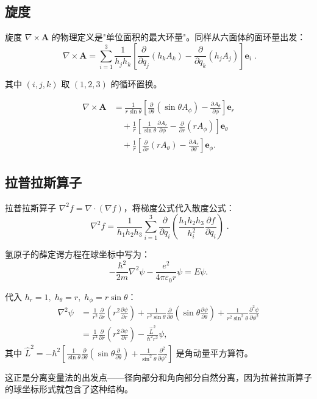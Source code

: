 \subsection{旋度}

旋度 $\nabla\times\mathbf{A}$ 的物理定义是"单位面积的最大环量"。同样从六面体的面环量出发：
\[
\boxed{\;
\nabla\times\mathbf{A}
= \sum_{i=1}^3\frac{1}{h_jh_k}
\left[\frac{\partial}{\partial q_j}(h_kA_k)-\frac{\partial}{\partial q_k}(h_jA_j)\right]\mathbf{e}_i
\;}.
\label{eq:curl_curvilinear}
\]

其中 $(i,j,k)$ 取 $(1,2,3)$ 的循环置换。

\begin{example}[球坐标中的旋度]
\begin{align*}
\nabla\times\mathbf{A}
&= \frac{1}{r\sin\theta}\left[
\frac{\partial}{\partial\theta}(\sin\theta A_\phi)
- \frac{\partial A_\theta}{\partial\phi}
\right]\mathbf{e}_r \\
&\quad + \frac{1}{r}\left[
\frac{1}{\sin\theta}\frac{\partial A_r}{\partial\phi}
- \frac{\partial}{\partial r}(r A_\phi)
\right]\mathbf{e}_\theta \\
&\quad + \frac{1}{r}\left[
\frac{\partial}{\partial r}(r A_\theta)
- \frac{\partial A_r}{\partial\theta}
\right]\mathbf{e}_\phi .
\end{align*}
\end{example}

\subsection{拉普拉斯算子}

拉普拉斯算子 $\nabla^2 f = \nabla\cdot(\nabla f)$，将梯度公式代入散度公式：
\[
\boxed{\;
\nabla^2 f = \frac{1}{h_1h_2h_3}\sum_{i=1}^3
\frac{\partial}{\partial q_i}\left(\frac{h_1h_2h_3}{h_i^2}
\frac{\partial f}{\partial q_i}\right)
\;}.
\label{eq:laplacian_curvilinear}
\]

\begin{example}
氢原子的薛定谔方程在球坐标中写为：
\[
-\frac{\hbar^2}{2m}\nabla^2\psi - \frac{e^2}{4\pi\varepsilon_0 r}\psi = E\psi.
\]

代入 $h_r=1,\;h_\theta=r,\;h_\phi=r\sin\theta$：
\begin{align*}
\nabla^2\psi &= \frac{1}{r^2}\frac{\partial}{\partial r}\left(r^2\frac{\partial\psi}{\partial r}\right)
+ \frac{1}{r^2\sin\theta}\frac{\partial}{\partial\theta}\left(\sin\theta\frac{\partial\psi}{\partial\theta}\right)
+ \frac{1}{r^2\sin^2\theta}\frac{\partial^2\psi}{\partial\phi^2} \\
&= \frac{1}{r^2}\frac{\partial}{\partial r}\left(r^2\frac{\partial\psi}{\partial r}\right)
- \frac{\hat{L}^2}{\hbar^2 r^2}\psi,
\end{align*}
其中 $\hat{L}^2 = -\hbar^2\left[\frac{1}{\sin\theta}\frac{\partial}{\partial\theta}\left(\sin\theta\frac{\partial}{\partial\theta}\right) + \frac{1}{\sin^2\theta}\frac{\partial^2}{\partial\phi^2}\right]$ 是角动量平方算符。

这正是分离变量法的出发点——径向部分和角向部分自然分离，因为拉普拉斯算子的球坐标形式就包含了这种结构。
\end{example}

